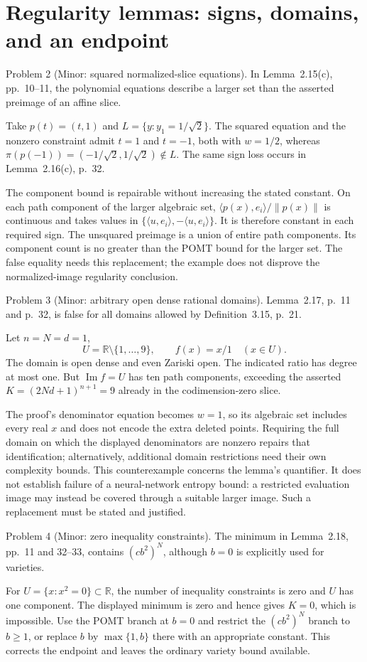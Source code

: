 \documentclass[10pt]{article}
\begin{document}
\section*{Regularity lemmas: signs, domains, and an endpoint}
Problem 2 (Minor: squared normalized-slice equations).  In Lemma 2.15(c), pp. 10–11, the polynomial equations describe a larger set than the asserted preimage of an affine slice.\par
Take \(p(t)=(t,1)\) and \(L=\{y:y_1=1/\sqrt2\}\). The squared equation and the nonzero constraint admit \(t=1\) and \(t=-1\), both with \(w=1/2\), whereas \(\pi(p(-1))=(-1/\sqrt2,1/\sqrt2)\notin L\). The same sign loss occurs in Lemma 2.16(c), p. 32.\par
The component bound is repairable without increasing the stated constant. On each path component of the larger algebraic set, \(\langle p(x),e_i\rangle/\|p(x)\|\) is continuous and takes values in \(\{\langle u,e_i\rangle,-\langle u,e_i\rangle\}\). It is therefore constant in each required sign. The unsquared preimage is a union of entire path components. Its component count is no greater than the POMT bound for the larger set. The false equality needs this replacement; the example does not disprove the normalized-image regularity conclusion.\par
Problem 3 (Minor: arbitrary open dense rational domains).  Lemma 2.17, p. 11 and p. 32, is false for all domains allowed by Definition 3.15, p. 21.\par
Let \(n=N=d=1\), \[U=\mathbb R\setminus\{1,\ldots,9\},\qquad f(x)=x/1\quad(x\in U).\] The domain is open dense and even Zariski open. The indicated ratio has degree at most one. But \(\operatorname{Im}f=U\) has ten path components, exceeding the asserted \(K=(2Nd+1)^{n+1}=9\) already in the codimension-zero slice.\par
The proof’s denominator equation becomes \(w=1\), so its algebraic set includes every real \(x\) and does not encode the extra deleted points. Requiring the full domain on which the displayed denominators are nonzero repairs that identification; alternatively, additional domain restrictions need their own complexity bounds. This counterexample concerns the lemma’s quantifier. It does not establish failure of a neural-network entropy bound: a restricted evaluation image may instead be covered through a suitable larger image. Such a replacement must be stated and justified.\par
Problem 4 (Minor: zero inequality constraints).  The minimum in Lemma 2.18, pp. 11 and 32–33, contains \((cb^2)^N\), although \(b=0\) is explicitly used for varieties.\par
For \(U=\{x:x^2=0\}\subset\mathbb R\), the number of inequality constraints is zero and \(U\) has one component. The displayed minimum is zero and hence gives \(K=0\), which is impossible. Use the POMT branch at \(b=0\) and restrict the \((cb^2)^N\) branch to \(b\ge1\), or replace \(b\) by \(\max\{1,b\}\) there with an appropriate constant. This corrects the endpoint and leaves the ordinary variety bound available.\par
\end{document}

